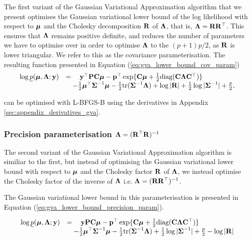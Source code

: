 The first variant of the Gaussian Variational Approximation algorithm that we present optimises the
Gaussian variational lower bound of the log likelihood with respect to ${\boldsymbol \mu}$ and the Cholesky decomposition
${\bf R}$ of ${\boldsymbol \Lambda}$, that is, ${\boldsymbol \Lambda} = {\bf R} {\bf R}^\top$. This ensures that ${\boldsymbol \Lambda}$ remains positive
definite, and reduces the number of parameters we have to optimise over in order to optimise ${\boldsymbol \Lambda}$
to the $(p + 1) p / 2$, as ${\bf R}$ is lower triangular.	We refer to this as the covariance
parameterisation. The resulting function presented in Equation (\ref{eq:gva_lower_bound_cov_param})
\begin{equation}
\label{eq:gva_lower_bound_cov_param}
\begin{array}{ll}
	\log \underline{p}({\boldsymbol \mu}, {\boldsymbol \Lambda}; {\bf y}) & = \quad {\bf y}^\top{\bf P} {\bf C} {\boldsymbol\mu} - {\bf p}^\top \exp\{{\bf C} {\boldsymbol \mu} + \tfrac{1}{2} \text{diag}({\bf C} {\boldsymbol \Lambda} {\bf C}^\top)\} \\
	& \quad - \tfrac{1}{2} {\boldsymbol \mu}^\top {\boldsymbol\Sigma}^{-1} {\boldsymbol \mu} - \tfrac{1}{2} \text{tr}{({\boldsymbol\Sigma}^{-1} {\boldsymbol\Lambda})} + \log{|{\bf R}|}
	                                        + \tfrac{1}{2} \log{|{\boldsymbol\Sigma}^{-1}|} + \tfrac{p}{2},                                                                              
\end{array}
\end{equation}

\noindent can be optimised with L-BFGS-B using the derivatives in Appendix \ref{sec:appendix_derivatives_gva}.
	
\subsubsection{Precision parameterisation ${\boldsymbol \Lambda} = ({\bf R}^\top {\bf R})^{-1}$}
		
\noindent The second variant of the Gaussian Variational Approximation algorithm is similiar to the first, but
instead of optimising the Gaussian variational lower bound with respect to ${\boldsymbol \mu}$ and the Cholesky factor
${\bf R}$ of ${\boldsymbol \Lambda}$, we instead optimise the Cholesky factor of the inverse of ${\boldsymbol \Lambda}$ i.e. ${\boldsymbol \Lambda} =
({\bf R} {\bf R}^\top)^{-1}$.

The Gaussian variational lower bound in this parameterisation is presented in Equation
(\ref{eq:gva_lower_bound_precision_param}).

\begin{equation}
\label{eq:gva_lower_bound_precision_param}
\begin{array}{ll}
	\log \underline{p}({\boldsymbol \mu}, {\boldsymbol \Lambda}; {\bf y}) & = \quad {\bf y}{\bf P}{\bf C} {\boldsymbol\mu} - {\bf p}^\top \exp\{{\bf C} {\boldsymbol \mu} + \tfrac{1}{2} \text{diag}({\bf C} {\boldsymbol \Lambda} {\bf C}^\top)\} \\
	&\quad - \tfrac{1}{2} {\boldsymbol \mu}^\top {\boldsymbol\Sigma}^{-1} {\boldsymbol \mu} - \tfrac{1}{2} \text{tr}{({\boldsymbol\Sigma}^{-1} {\boldsymbol\Lambda})}
        + \tfrac{1}{2} \log{|{\boldsymbol\Sigma}^{-1}|} + \tfrac{p}{2} - \log{|{\bf R}|}
\end{array}
\end{equation}
		
